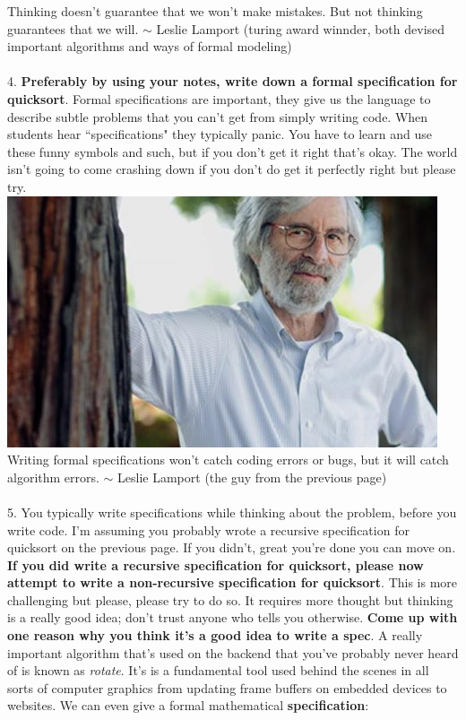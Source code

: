 \documentclass[12pt]{article}
\begin{document}
Thinking doesn't guarantee that we won't make mistakes. But not thinking guarantees that we will. $\sim$ Leslie Lamport (turing award winnder, both devised important algorithms and ways of formal modeling)\\\\
4. \textbf{Preferably by using your notes, write down a formal specification for quicksort}. Formal specifications are important, they give us the language to describe subtle problems that you can't get from simply writing code. When students hear ``specifications" they typically panic. You have to learn and use these funny symbols and such, but if you don't get it right that's okay. The world isn't going to come crashing down if you don't do get it perfectly right but please try.  
\newpage
\noindent \includegraphics[scale = 0.5]{lamport2.jpg}
Writing formal specifications won't catch coding errors or bugs, but it will catch algorithm errors. $\sim$ Leslie Lamport (the guy from the previous page)
\\\\5. You typically write specifications while thinking about the problem, before you write code. I'm assuming you probably wrote a recursive specification for quicksort on the previous page. If you didn't, great you're done you can move on. \textbf{If you did write a recursive specification for quicksort, please now attempt to write a non-recursive specification for quicksort}. This is more challenging but please, please try to do so. It requires more thought but thinking is a really good idea; don't trust anyone who tells you otherwise. \textbf{Come up with one reason why you think it's a good idea to write a spec}.
\newpage
\noindent A really important algorithm that's used on the backend that you've probably never heard of is known as \textit{rotate}. It's is a fundamental tool used behind the scenes in all sorts of computer graphics from updating frame buffers on embedded devices to websites. We can even give a formal mathematical \textbf{specification}:  \\\\
\end{document}
